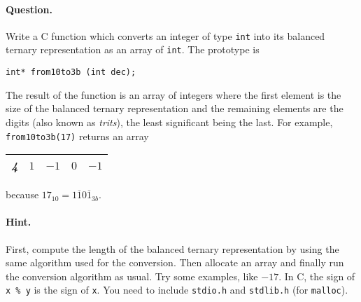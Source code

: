 \paragraph{Question.} Write a C function
  which converts an integer of type \texttt{int} into its balanced
  ternary representation as an array of \texttt{int}. The prototype
  is
\begin{verbatim}
int* from10to3b (int dec);
\end{verbatim}
The result of the function is an array of integers where the first
  element is the size of the balanced ternary representation and the
  remaining elements are the digits (also known as \emph{trits}), the
  least significant being the last. For
  example, \texttt{from10to3b(17)} returns an array
\begin{center}
\begin{tabular}{|c|c|c|c|c|}
\hline
\emph{\textbf{4}} & \(1\) & \(-1\) & \(0\) & \(-1\)\\
\hline
\end{tabular}
\end{center}
because \(17_{10} = 1\overline{1}0\overline{1}_{3b}\).

\paragraph{Hint.} First, compute the length of the balanced ternary
  representation by using the same algorithm used for the
  conversion. Then allocate an array and finally run the conversion
  algorithm as usual. Try some examples, like \(-17\). In C, the sign
  of \texttt{x \% y} is the sign of \texttt{x}. You need to include
  \texttt{stdio.h} and \texttt{stdlib.h} (for \texttt{malloc}).

